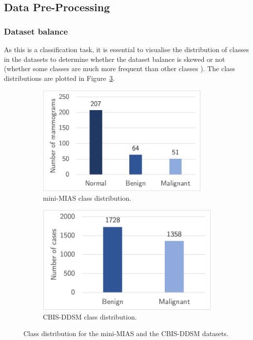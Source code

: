 \subsection{Data Pre-Processing}

\subsubsection{Dataset balance}
\label{sec:design-dataset-balance}

As this is a classification task, it is essential to visualise the distribution of classes in the datasets to determine whether the dataset balance is skewed or not (whether some classes are much more frequent than other classes \citep{Geron2019}). The class distributions are plotted in Figure~\ref{fig:design-datasets-balance}.

\begin{figure}[h]
\centering
\begin{subfigure}{.5\textwidth}
  \centering
  \includegraphics[width=0.94\textwidth]{figures/design/mini-mias-balance.png}
  \caption{mini-MIAS class distribution.}
  \label{fig:design-mini-mias-balance}
\end{subfigure}%
\begin{subfigure}{.5\textwidth}
  \centering
  \includegraphics[width=\textwidth]{figures/design/cbis-ddsm-balance.png}
  \caption{CBIS-DDSM class distribution.}
  \label{fig:cbis-ddsm-balance}
\end{subfigure}
\caption{\label{fig:design-datasets-balance}Class distribution for the mini-MIAS and the CBIS-DDSM datasets.}
\end{figure}

